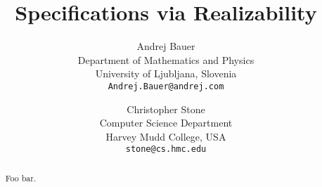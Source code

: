\documentclass{article}
\begin{document}
\twocolumn

\title{Specifications via Realizability}

\author{
  Andrej Bauer\\
  {\small Department of Mathematics and Physics}\\
  {\small University of Ljubljana, Slovenia}\\
  {\small \texttt{Andrej.Bauer@andrej.com}}
  \and
  Christopher Stone\\
  {\small Computer Science Department}\\
  {\small Harvey Mudd College, USA}\\
  {\small \texttt{stone@cs.hmc.edu}}
}

\maketitle

\begin{abstract}
  Foo bar.
\end{abstract}

















\end{document}
